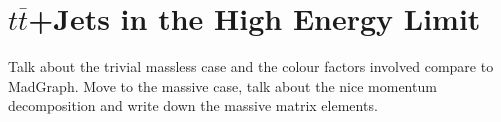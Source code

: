 \chapter{$t\overline t$+Jets in the High Energy Limit}
\label{chap:ttbar}

Talk about the trivial massless case and the colour factors involved compare to MadGraph.  Move to the massive case, talk about the nice momentum decomposition and write down the massive matrix elements.


